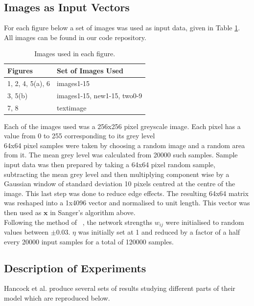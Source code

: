 \subsection{Images as Input Vectors}

For each figure below a set of images was used as input data, given in Table \ref{tab:Table 1}. All images can be found in our code repository. 
\begin{table}[h]
    \centering
    \begin{tabular}{ll}
    \hline
    Figures&Set of Images Used\\
    \hline
    1, 2, 4, 5(a), 6&images1-15\\
    3, 5(b)&images1-15, new1-15, two0-9\\
    7, 8&textimage\\
    \hline
    \end{tabular}
    \caption{Images used in each figure.}
    \label{tab:Table 1}
\end{table}
Each of the images used was a 256x256 pixel greyscale image. Each pixel has a value from 0 to 255 corresponding to its grey level\\
64x64 pixel samples were taken by choosing a random image and a random area from it. The mean grey level was calculated from 20000 such samples. Sample input data was then prepared by taking a 64x64 pixel random sample, subtracting the mean grey level and then multiplying component wise by a Gaussian window of standard deviation 10 pixels centred at the centre of the image. This last step was done to reduce edge effects. The resulting 64x64 matrix was reshaped into a 1x4096 vector and normalised to unit length. This vector was then used as $\textbf{x}$ in Sanger's algorithm above.\\
Following the method of ~\cite{Hancock}, the network strengths $w_{ij}$ were initialised to random values between $\pm 0.03$. $\eta$ was initially set at 1 and reduced by a factor of a half every 20000 input samples for a total of 120000 samples.

\subsection{Description of Experiments}
Hancock et al. produce several sets of results studying different parts of their model which are reproduced below.
